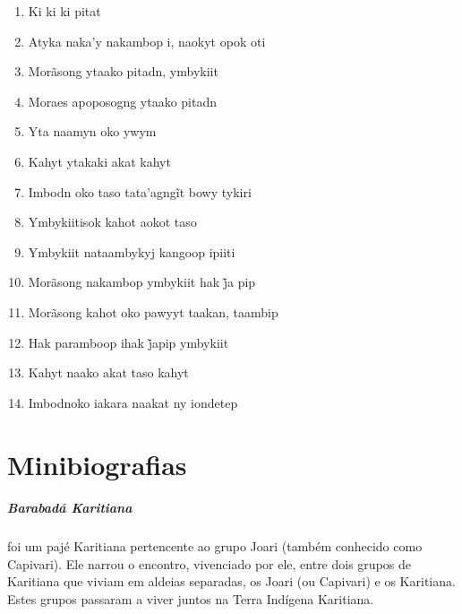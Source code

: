 \begin{enumerate}
 \item Ki ki ki pitat

 \begin{center}\end{center}

 \item Atyka naka'y nakambop i, naokyt opok oti

 \item Morãsong ytaako pitadn, ymbykiit

 \item Moraes apoposogng ytaako pitadn

 \item Yta naamyn oko ywym

 \item Kahyt ytakaki akat kahyt

 \item Imbodn oko taso tata’agngĩt bowy tykiri

 \item Ymbykiitisok kahot aokot taso

 \item Ymbykiit nataambykyj kangoop ipiiti

 \item Morãsong nakambop ymbykiit hak j̃a pip

 \item Morãsong kahot oko pawyyt taakan, taambip

 \item Hak paramboop ihak j̃apip ymbykiit

 \item Kahyt naako akat taso kahyt

 \item Imbodnoko iakara naakat ny iondetep
\end{enumerate}

 \chapter{Minibiografias}

 \paragraph{Barabadá Karitiana} foi um pajé Karitiana pertencente ao grupo Joari
 (também conhecido como Capivari). Ele narrou o encontro, vivenciado por
 ele, entre dois grupos de Karitiana que viviam em aldeias separadas, os
 Joari (ou Capivari) e os Karitiana. Estes grupos passaram a viver juntos
 na Terra Indígena Karitiana.

